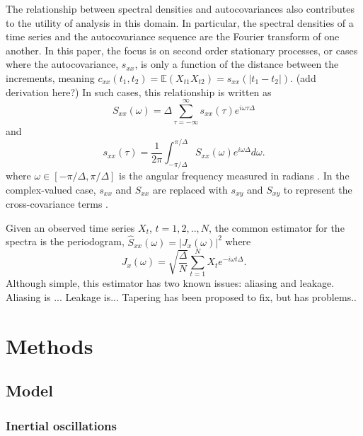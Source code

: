 \documentclass{stat572Style}
\begin{document}
The relationship between spectral densities and autocovariances also contributes to the utility of analysis in this domain. In particular, the spectral densities of a time series and the autocovariance sequence are the Fourier transform of one another.  In this paper, the focus is on second order stationary processes,  or cases where the autocovariance, $s_{xx}$, is only a function of the distance between the increments,  meaning $c_{xx}(t_{1}, t_{2}) = \mathbb{E}(X_{t1}X_{t2}) = s_{xx}(|t_{1} - t_{2}|)$.  (add derivation here?) In such cases, this relationship is written as 
	\begin{equation}
	S_{xx}(\omega) = \Delta \sum_{\tau = -\infty}^{\infty} s_{xx}(\tau)e^{i\omega \tau \Delta} 
	\end{equation}
and 
	\begin{equation}
		s_{xx}(\tau) = \frac{1}{2\pi} \int_{-\pi / \Delta}^{\pi / \Delta}S_{xx}(\omega)e^{i \omega \Delta}d \omega.
	\end{equation}
\noindent where $\omega \in [-\pi/\Delta, \pi/ \Delta]$ is the angular frequency measured in radians \citep{Sykulski2013}
.  In the complex-valued case, $s_{xx}$ and $S_{xx}$ are replaced with $s_{xy}$ and $S_{xy}$ to represent the cross-covariance terms \citep{Sykulski2013}. 

Given an observed time series $X_{t}$, $t = 1,2,..,N$, the common estimator for the spectra is the periodogram, $\hat{S}_{xx}(\omega) = |J_{x}(\omega)|^{2}$ where 
\begin{equation}
J_{x}(\omega) = \sqrt{\frac{\Delta}{N}} \sum_{t=1}^{N} X_{t}e^{-i \omega t \Delta}. 
\end{equation}
Although simple, this estimator has two known issues: aliasing and leakage.  Aliasing is ... Leakage is... Tapering has been proposed to fix, but has problems.. 


\section{Methods}

\subsection{Model}
\subsubsection{Inertial oscillations}
\end{document}
